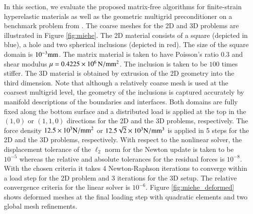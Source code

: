 \documentclass[AMA,STIX1COL]{WileyNJD-v2}
\begin{document}
In this section, we evaluate the proposed matrix-free algorithms for finite-strain hyperelastic materials as well as the geometric multigrid preconditioner
on a benchmark problem from \cite{Miehe2007}. The coarse meshes for the 2D and 3D problems are illustrated in Figure \ref{fig:miehe}.
The 2D material consists of a square (depicted in blue), a hole and two spherical inclusions (depicted in red). The size of the square domain is $10^{-3} \rm{mm}$.
The matrix material is taken to have Poisson's ratio $0.3$ and shear modulus $\mu=0.4225 \times 10^6\, \rm{N/mm^2}$. The inclusion is taken to be $100$ times stiffer.
The 3D material is obtained by extrusion of the 2D geometry into the third dimension.
Note that although a relatively coarse mesh is used at the coarsest multigrid level, the geometry of the inclusions is captured accurately by manifold descriptions of the boundaries and interfaces.
Both domains are fully fixed along the bottom surface and a distributed load is applied at the top in the $(1,0)$ or $(1,1,0)$ directions for the 2D and the 3D problems, respectively.
The force density $12.5 \times 10^3 \rm{N/mm^2}$ or $12.5 \sqrt{2} \times 10^3 \rm{N/mm^3}$ is applied in 5 steps for the 2D and the 3D problems, respectively.
With respect to the nonlinear solver, the displacement tolerance of the $\mathcal{\ell}_2$ norm for the Newton update is taken to be $10^{-5}$
whereas the relative and absolute tolerances for the residual forces is $10^{-8}$.
{\color{red}
With the chosen criteria it takes 4 Newton-Raphson iterations to converge within a load step for the 2D problem and 3 iterations for the 3D setup.
}
The relative convergence criteria for the linear solver is $10^{-6}$.
%
Figure \ref{fig:miehe_deformed} shows deformed meshes at the final loading step with quadratic elements and two global mesh refinements.
%
\end{document}
